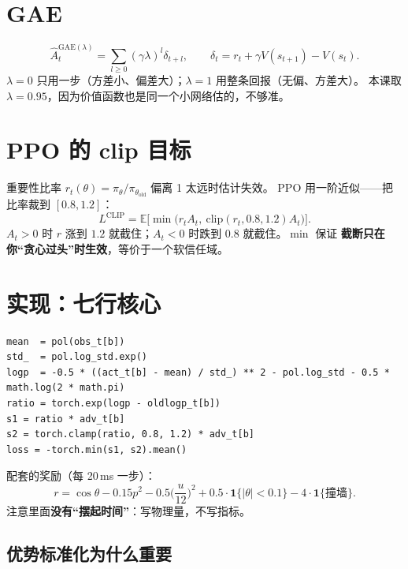 \section{GAE}

\begin{equation}
  \hat A_t^{\mathrm{GAE}(\lambda)}=\sum_{l\ge0}(\gamma\lambda)^l\delta_{t+l},
  \qquad \delta_t=r_t+\gamma V(s_{t+1})-V(s_t).
\end{equation}
$\lambda=0$ 只用一步（方差小、偏差大）；$\lambda=1$ 用整条回报（无偏、方差大）。
本课取 $\lambda=0.95$，因为价值函数也是同一个小网络估的，不够准。

\section{PPO 的 clip 目标}

重要性比率 $r_t(\theta)=\pi_\theta/\pi_{\theta_{\text{old}}}$ 偏离 1 太远时估计失效。
PPO 用一阶近似——把比率裁到 $[0.8,1.2]$：
\begin{equation}
  L^{\mathrm{CLIP}}=\mathbb{E}\big[\min\big(r_tA_t,\ \mathrm{clip}(r_t,0.8,1.2)A_t\big)\big].
\end{equation}
$A_t>0$ 时 $r$ 涨到 $1.2$ 就截住；$A_t<0$ 时跌到 $0.8$ 就截住。$\min$ 保证
\textbf{截断只在你“贪心过头”时生效}，等价于一个软信任域。

\section{实现：七行核心}

\begin{lstlisting}[caption={PPO 的核心更新（rl.py）}]
mean  = pol(obs_t[b])
std_  = pol.log_std.exp()
logp  = -0.5 * ((act_t[b] - mean) / std_) ** 2 - pol.log_std - 0.5 * math.log(2 * math.pi)
ratio = torch.exp(logp - oldlogp_t[b])
s1 = ratio * adv_t[b]
s2 = torch.clamp(ratio, 0.8, 1.2) * adv_t[b]
loss = -torch.min(s1, s2).mean()
\end{lstlisting}

配套的奖励（每 20\,ms 一步）：
\begin{equation}
  r=\cos\theta-0.15p^2-0.5\Big(\frac{u}{12}\Big)^2+0.5\cdot\mathbf1\{|\theta|<0.1\}
   -4\cdot\mathbf1\{\text{撞墙}\}.
\end{equation}
注意里面\textbf{没有“摆起时间”}：写物理量，不写指标。

\subsection{优势标准化为什么重要}

